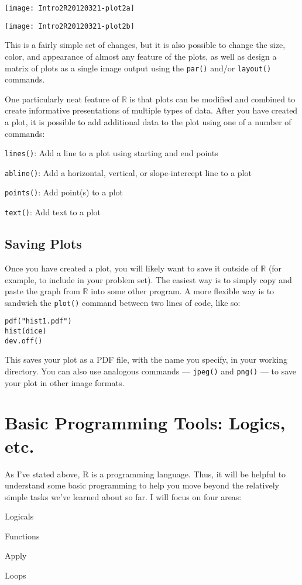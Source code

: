 \documentclass[12pt]{article}
\begin{document}
\begin{minipage}[b]{0.5\linewidth}
\texttt{[image: Intro2R20120321-plot2a]}
\end{minipage}
\begin{minipage}[b]{0.5\linewidth}
\texttt{[image: Intro2R20120321-plot2b]}
\end{minipage}

This is a fairly simple set of changes, but it is also possible to change the size, color, and appearance of almost any feature of the plots, as well as design a matrix of plots as a single image output using the \verb|par()| and/or \verb|layout()| commands.

One particularly neat feature of $\mathbb{R}$ is that plots can be modified and combined to create informative presentations of multiple types of data. After you have created a plot, it is possible to add additional data to the plot using one of a number of commands:
\begin{itemize*}
\item \verb|lines()|: Add a line to a plot using starting and end points
\item \verb|abline()|: Add a horizontal, vertical, or slope-intercept line to a plot
\item \verb|points()|: Add point(s) to a plot
\item \verb|text()|: Add text to a plot
\end{itemize*}

\subsection{Saving Plots}
Once you have created a plot, you will likely want to save it outside of $\mathbb{R}$ (for example, to include in your problem set). The easiest way is to simply copy and paste the graph from $\mathbb{R}$ into some other program. A more flexible way is to sandwich the \verb|plot()| command between two lines of code, like so:
\begin{verbatim}
pdf("hist1.pdf")
hist(dice)
dev.off()
\end{verbatim}
This saves your plot as a PDF file, with the name you specify, in your working directory. You can also use analogous commands --- \verb|jpeg()| and \verb|png()| --- to save your plot in other image formats.

\section{Basic Programming Tools: Logics, etc.}\label{sec:programming}
As I've stated above, R is a programming language. Thus, it will be helpful to understand some basic programming to help you move beyond the relatively simple tasks we've learned about so far. I will focus on four areas:
\begin{enumerate*}
\item Logicals
\item Functions
\item Apply
\item Loops
\end{enumerate*}
\end{document}
